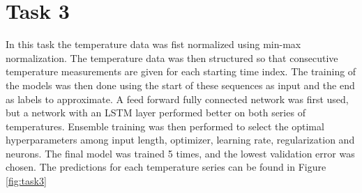 \documentclass[a4paper]{article}
\begin{document}
\section*{Task 3}
In this task the temperature data was fist normalized using min-max normalization. The temperature data was then structured so that consecutive temperature measurements are given for each starting time index. The training of the models was then done using the start of these sequences as input and the end as labels to approximate. A feed forward fully connected network was first used, but a network with an LSTM layer performed better on both series of temperatures. Ensemble training was then performed to select the optimal hyperparameters among input length, optimizer, learning rate, regularization and neurons. The final model was trained 5 times, and the lowest validation error was chosen. The predictions for each temperature series can be found in Figure \ref{fig:task3}
\end{document}
